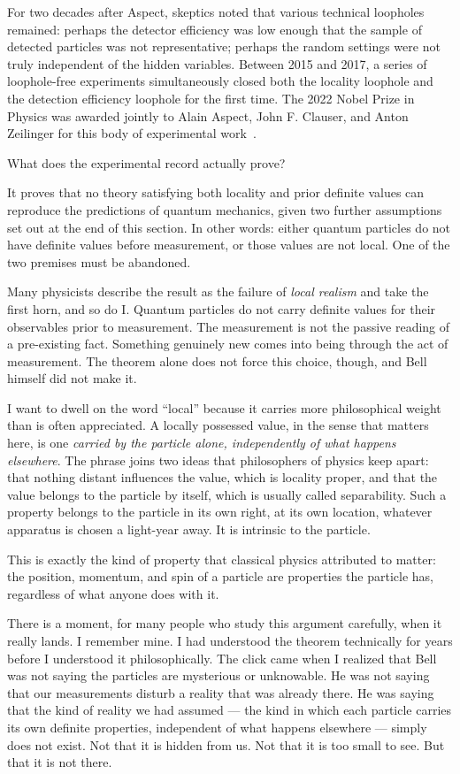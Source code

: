For two decades after Aspect, skeptics noted that various technical loopholes
remained: perhaps the detector efficiency was low enough that the sample of detected
particles was not representative; perhaps the random settings were not truly
independent of the hidden variables.
Between 2015 and 2017, a series of loophole-free experiments simultaneously
closed both the locality loophole and the detection efficiency loophole for the
first time.
The 2022 Nobel Prize in Physics was awarded jointly to Alain Aspect, John F.
Clauser, and Anton Zeilinger for this body of experimental work~\citep{Zeilinger2023Nobel}.

What does the experimental record actually prove?

It proves that no theory satisfying both locality and prior definite values can
reproduce the predictions of quantum mechanics, given two further assumptions
set out at the end of this section.
In other words: either quantum particles do not have definite values before
measurement, or those values are not local.
One of the two premises must be abandoned.

Many physicists describe the result as the failure of \emph{local realism} and
take the first horn, and so do I.
Quantum particles do not carry definite values for their observables prior to
measurement.
The measurement is not the passive reading of a pre-existing fact.
Something genuinely new comes into being through the act of measurement.
The theorem alone does not force this choice, though, and Bell himself did not
make it.

I want to dwell on the word ``local'' because it carries more philosophical weight
than is often appreciated.
A locally possessed value, in the sense that matters here, is one \emph{carried by
the particle alone, independently of what happens elsewhere}.
The phrase joins two ideas that philosophers of physics keep apart: that nothing
distant influences the value, which is locality proper, and that the value
belongs to the particle by itself, which is usually called separability.
Such a property belongs to the particle in its own right, at its own location,
whatever apparatus is chosen a light-year away.
It is intrinsic to the particle.

This is exactly the kind of property that classical physics attributed to matter:
the position, momentum, and spin of a particle are properties the particle has,
regardless of what anyone does with it.

There is a moment, for many people who study this argument carefully, when it
really lands.
I remember mine.
I had understood the theorem technically for years before I understood it
philosophically.
The click came when I realized that Bell was not saying the particles are
mysterious or unknowable.
He was not saying that our measurements disturb a reality that was already there.
He was saying that the kind of reality we had assumed --- the kind in which each
particle carries its own definite properties, independent of what happens
elsewhere --- simply does not exist.
Not that it is hidden from us.
Not that it is too small to see.
But that it is not there.

